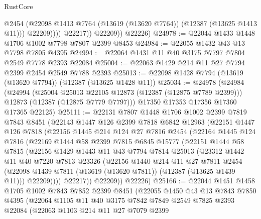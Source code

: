 \begin{lexlean}{RustCore}
\begin{coremodule}
                      @2454
                      (@22098 @1413 @7764 (@13619 (@13620 @7764)) (@12387 (@13625 @1413 @11)))
                      @22209))))
              @22217))
          @22209))
      @22226)
@24978 := @22044 @1433 @1448 @1706 @1002 @7798 @7807 @2399 @8453
@24984 := @22055 @1432 @43 @13 @7798 @7805 @4395
@24994 := @22064 @1431 @11 @40 @3175 @7797 @7804 @2549 @7778 @2393 @22084
@25004 := @22063 @1429 @214 @11 @27 @7794 @2399 @2454 @2549 @7788 @2393
@25013 := @22098 @1428 @7794 (@13619 (@13620 @7794)) (@12387 (@13625 @1428 @11))
@25034 := @24978
    (@24984
      (@24994
        (@25004 @25013 @22105 @12873 (@12387 (@12875 @7789 @2399)))
        @12873
        (@12387 (@12875 @7779 @7797)))
      @17350
      @17353
      @17356
      @17360
      @17365
      @22125)
@25111 := @22131
    @7807
    @1448
    @1706
    @1002
    @2399
    @7819
    @7843
    @8451
    (@22143
      @1447
      @126
      @2399
      @7818
      @6842
      @12963
      (@22151
        @1447
        @126
        @7818
        (@22156
          @1445
          @214
          @124
          @27
          @7816
          @2454
          (@22164
            @1445
            @124
            @7816
            (@22169
              @1444
              @58
              @2399
              @7815
              @6845
              @15777
              (@22151
                @1444
                @58
                @7815
                (@22156
                  @1429
                  @1443
                  @11
                  @43
                  @7794
                  @7814
                  @25013
                  (@23312
                    @1442
                    @11
                    @40
                    @7220
                    @7813
                    @23326
                    (@22156
                      @1440
                      @214
                      @11
                      @27
                      @7811
                      @2454
                      (@22098 @1439 @7811 (@13619 (@13620 @7811)) (@12387 (@13625 @1439 @11)))
                      @22209))))
              @22217))
          @22209))
      @22226)
@25166 := @22044
    @1451
    @1458
    @1705
    @1002
    @7843
    @7852
    @2399
    @8451
    (@22055
      @1450
      @43
      @13
      @7843
      @7850
      @4395
      (@22064
        @1105
        @11
        @40
        @3175
        @7842
        @7849
        @2549
        @7825
        @2393
        @22084
        (@22063
          @1103
          @214
          @11
          @27
          @7079
          @2399

\end{coremodule}
\end{lexlean}

